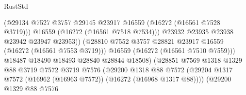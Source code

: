 \begin{lexlean}{RustStd}
\begin{coremodule}
                                              (@29134
                                                @7527
                                                @3757
                                                @29145
                                                @23917
                                                @16559
                                                (@16272 (@16561 @7528 @3719)))
                                              @16559
                                              (@16272 (@16561 @7518 @7534)))
                                            @23932
                                            @23935
                                            @23938
                                            @23942
                                            @23947
                                            @23953))
                                        (@28810
                                          @7552
                                          @3757
                                          @28821
                                          @23917
                                          @16559
                                          (@16272 (@16561 @7553 @3719)))
                                        @16559
                                        (@16272 (@16561 @7510 @7559)))
                                      @18487
                                      @18490
                                      @18493
                                      @28840
                                      @28844
                                      @18508)
                                    (@28851
                                      @7569
                                      @1318
                                      @1329
                                      @88
                                      @3719
                                      @7572
                                      @3719
                                      @7576
                                      (@29200
                                        @1318
                                        @88
                                        @7572
                                        (@29204
                                          @1317
                                          @7572
                                          (@16962 (@16963 @7572))
                                          (@16272 (@16968 @1317 @88))))
                                      (@29200
                                        @1329
                                        @88
                                        @7576

\end{coremodule}
\end{lexlean}
